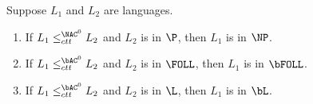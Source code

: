 \begin{lemma}\label{lem:ctt}
  Suppose $L_1$ and $L_2$ are languages.
  \begin{enumerate}
  \item If $L_1 \leq^{\NAC^0}_{ctt} L_2$ and $L_2$ is in $\P$, then $L_1$ is in $\NP$.
  \item If $L_1 \leq^{\bAC^0}_{ctt} L_2$ and $L_2$ is in $\FOLL$, then $L_1$ is in $\bFOLL$.
  \item If $L_1 \leq^{\bAC^0}_{ctt} L_2$ and $L_2$ is in $\L$, then $L_1$ is in $\bL$.
  \end{enumerate}
\end{lemma}
